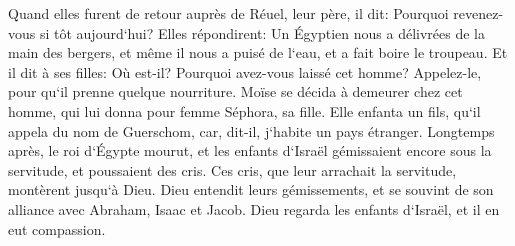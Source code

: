 \verse Quand elles furent de retour auprès de Réuel, leur père, il dit: Pourquoi revenez-vous si tôt aujourd`hui? 
\verse Elles répondirent: Un Égyptien nous a délivrées de la main des bergers, et même il nous a puisé de l`eau, et a fait boire le troupeau. 
\verse Et il dit à ses filles: Où est-il? Pourquoi avez-vous laissé cet homme? Appelez-le, pour qu`il prenne quelque nourriture. 
\verse Moïse se décida à demeurer chez cet homme, qui lui donna pour femme Séphora, sa fille. 
\verse Elle enfanta un fils, qu`il appela du nom de Guerschom, car, dit-il, j`habite un pays étranger. 
\verse Longtemps après, le roi d`Égypte mourut, et les enfants d`Israël gémissaient encore sous la servitude, et poussaient des cris. Ces cris, que leur arrachait la servitude, montèrent jusqu`à Dieu. 
\verse Dieu entendit leurs gémissements, et se souvint de son alliance avec Abraham, Isaac et Jacob. 
\verse Dieu regarda les enfants d`Israël, et il en eut compassion. 

\chapter{}

